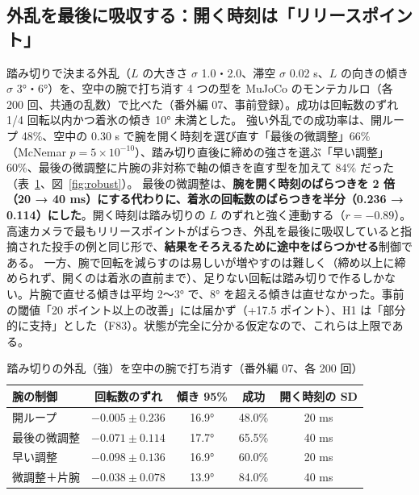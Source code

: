 \documentclass[paper=a4paper,fontsize=10pt,twocolumn,column_gap=2zw,line_length=24zw,number_of_lines=46,head_space=20mm]{jlreq}
\begin{document}
\subsection{外乱を最後に吸収する：開く時刻は「リリースポイント」}
踏み切りで決まる外乱（$L$ の大きさ $\sigma$ 1.0・2.0、滞空 $\sigma$ 0.02 s、$L$ の向きの傾き $\sigma$ 3°・6°）を、空中の腕で打ち消す 4 つの型を MuJoCo のモンテカルロ（各 200 回、共通の乱数）で比べた（番外編 07、事前登録）。成功は回転数のずれ 1/4 回転以内かつ着氷の傾き 10° 未満とした。
強い外乱での成功率は、開ループ 48\%、空中の 0.30 s で腕を開く時刻を選び直す「最後の微調整」66\%（McNemar $p=5\times10^{-10}$）、踏み切り直後に締めの強さを選ぶ「早い調整」60\%、最後の微調整に片腕の非対称で軸の傾きを直す型を加えて 84\% だった（表~\ref{tab:axel}、図~\ref{fig:robust}）。
最後の微調整は、\textbf{腕を開く時刻のばらつきを 2 倍（20 → 40 ms）にする代わりに、着氷の回転数のばらつきを半分（0.236 → 0.114）にした}。開く時刻は踏み切りの $L$ のずれと強く連動する（$r=-0.89$）。高速カメラで最もリリースポイントがばらつき、外乱を最後に吸収していると指摘された投手の例と同じ形で、\textbf{結果をそろえるために途中をばらつかせる}制御である。
一方、腕で回転を減らすのは易しいが増やすのは難しく（締め以上に締められず、開くのは着氷の直前まで）、足りない回転は踏み切りで作るしかない。片腕で直せる傾きは平均 2〜3° で、8° を超える傾きは直せなかった。事前の閾値「20 ポイント以上の改善」には届かず（+17.5 ポイント）、H1 は「部分的に支持」とした（F83）。状態が完全に分かる仮定なので、これらは上限である。

\begin{table}[t]\centering\footnotesize
\caption{踏み切りの外乱（強）を空中の腕で打ち消す（番外編 07、各 200 回）}\label{tab:axel}
\setlength{\tabcolsep}{2pt}
\begin{tabular}{lcccc}\toprule
腕の制御 & 回転数のずれ & 傾き 95\% & 成功 & 開く時刻の SD \\\midrule
開ループ & $-0.005\pm0.236$ & 16.9° & 48.0\% & 20 ms \\
最後の微調整 & $-0.071\pm0.114$ & 17.7° & 65.5\% & 40 ms \\
早い調整 & $-0.098\pm0.136$ & 16.9° & 60.0\% & 20 ms \\
微調整＋片腕 & $-0.038\pm0.078$ & 13.9° & 84.0\% & 40 ms \\\bottomrule
\end{tabular}
\end{table}
\end{document}
